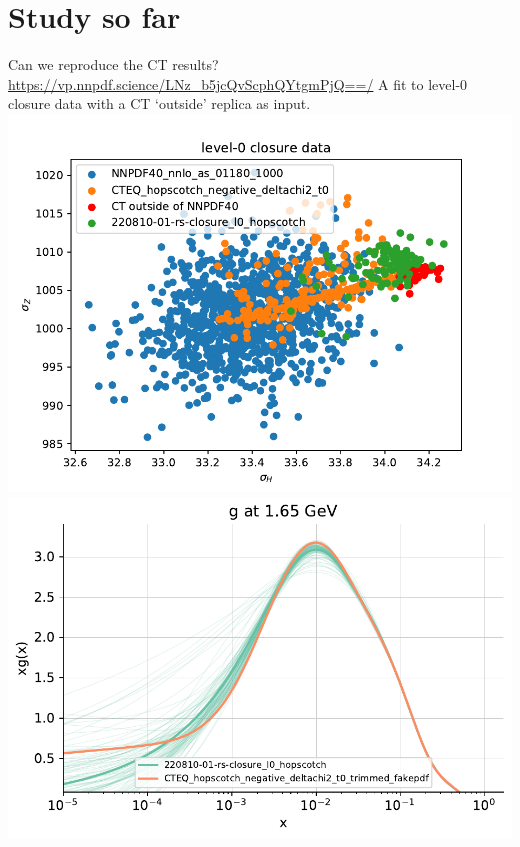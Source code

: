 \documentclass[aspectratio=169,10pt]{beamer}
\begin{document}
\section{Study so far}

\begin{frame}[t]{Can we reproduce the CT results?}{\url{https://vp.nnpdf.science/LNz_b5jcQvScphQYtgmPjQ==/}}
      A fit to level-0 closure data with a CT `outside' replica as input.\\
      \includegraphics[height=.65\textheight]{level-0_closure_data.pdf}
      \includegraphics[height=.65\textheight]{level-0_gluon.pdf}
\end{frame}
\end{document}
